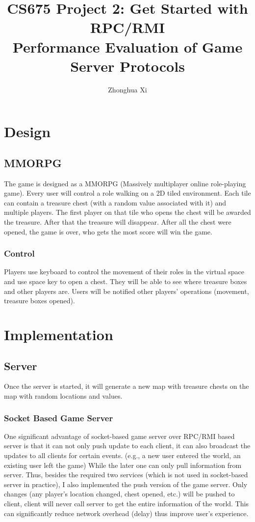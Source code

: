 \documentclass[11pt, oneside]{article}   	%
\title{CS675 Project 2: Get Started with RPC/RMI \\
Performance Evaluation of Game Server Protocols}
\author{Zhonghua Xi}
\begin{document}
\maketitle

\section{Design}
\subsection{MMORPG}
The game is designed as a MMORPG (Massively multiplayer online role-playing game). Every user will control a role walking on a 2D tiled environment. Each tile can contain a treasure chest (with a random value associated with it) and multiple players. The first player on that tile who opens the chest will be awarded the treasure. After that the treasure will disappear. After all the chest were opened, the game is over, who gets the most score will win the game.

\subsubsection{Control}
Players use keyboard to control the movement of their roles in the virtual space and use space key to open a chest. They will be able to see where treasure boxes and other players are. Users will be notified other players' operations (movement, treasure boxes opened).

\section{Implementation}
\subsection{Server}
Once the server is started, it will generate a new map with treasure chests on the map with random locations and values.

\subsubsection{Socket Based Game Server}
One significant advantage of socket-based game server over RPC/RMI based server is that it can not only push update to each client, it can also broadcast the updates to all clients for certain events. (e.g., a new user entered the world, an existing user left the game)
While the later one can only pull information from server. Thus, besides the required two services (which is not used in socket-based server in practice), I also implemented the push version of the game server. Only changes (any player's location changed, chest opened, etc.) will be pushed to client, client will never call server to get the entire information of the world. This can significantly reduce network overhead (delay) thus improve user's experience.
\end{document}
